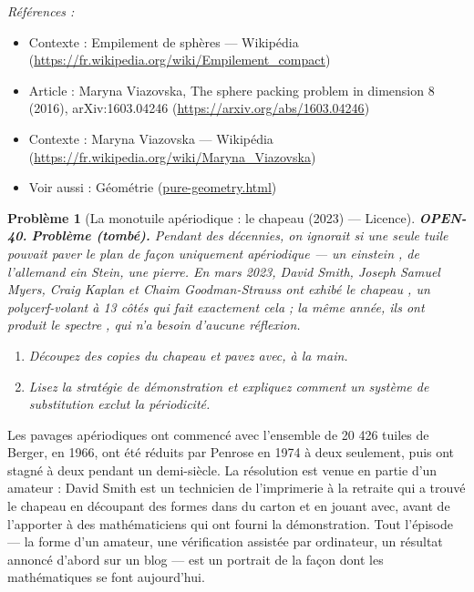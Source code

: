 \documentclass[11pt]{article}
\newtheorem{problem}{Problème}
\newenvironment{refs}{\par\small\noindent\emph{Références :}\begin{itemize}\setlength\itemsep{0pt}}{\end{itemize}\normalsize}
\begin{document}
\begin{refs}
\item Contexte : Empilement de sphères --- Wikipédia (\url{https://fr.wikipedia.org/wiki/Empilement_compact})
\item Article : Maryna Viazovska, \og{} The sphere packing problem in dimension 8 \fg{} (2016), arXiv:1603.04246 (\url{https://arxiv.org/abs/1603.04246})
\item Contexte : Maryna Viazovska --- Wikipédia (\url{https://fr.wikipedia.org/wiki/Maryna_Viazovska})
\item Voir aussi : Géométrie (\url{pure-geometry.html})
\end{refs}

\bigskip

\begin{problem}[{La monotuile apériodique : le \og{} chapeau \fg{} (2023) --- Licence}]
\textbf{OPEN-40.} \textbf{Problème (tombé).} Pendant des décennies, on ignorait si une seule tuile pouvait
paver le plan de façon uniquement apériodique --- un \og{} einstein \fg{}, de l'allemand
\textit{ein Stein}, une pierre. En mars 2023, David Smith, Joseph Samuel Myers, Craig Kaplan
et Chaim Goodman-Strauss ont exhibé le \og{} chapeau \fg{}, un polycerf-volant à 13 côtés qui fait
exactement cela ; la même année, ils ont produit le \og{} spectre \fg{}, qui n'a besoin d'aucune
réflexion.
\begin{enumerate}
\item[(a)] Découpez des copies du chapeau et pavez avec, à la main.
\item[(b)] Lisez la stratégie de démonstration et expliquez comment un système de substitution
exclut la périodicité.
\end{enumerate}

\end{problem}

\noindent Les pavages apériodiques ont commencé avec l'ensemble de 20 426 tuiles
de Berger, en 1966, ont été réduits par Penrose en 1974 à deux seulement, puis ont stagné à
deux pendant un demi-siècle. La résolution est venue en partie d'un amateur : David Smith
est un technicien de l'imprimerie à la retraite qui a trouvé le chapeau en découpant des
formes dans du carton et en jouant avec, avant de l'apporter à des mathématiciens qui ont
fourni la démonstration. Tout l'épisode --- la forme d'un amateur, une vérification assistée
par ordinateur, un résultat annoncé d'abord sur un blog --- est un portrait de la façon dont
les mathématiques se font aujourd'hui.
\end{document}

